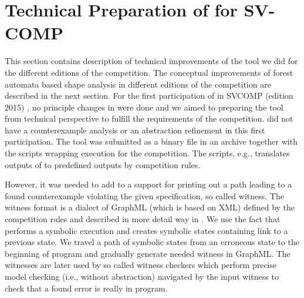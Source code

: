 {%


\section{Technical Preparation of \forester for SV-COMP}
This section contains description of technical improvements of the tool we did
for the different editions of the  competition.
The conceptual improvements of forest automata based shape analysis in different
editions of the competition are described in the next section.
For the first participation of \forester in SVCOMP (edition 2015) \cite{svcomp15-forester},
no principle changes in \forester were done and we aimed to preparing the tool from technical
perspective to fulfill the requirements of the competition.
\forester did not have a counterexample analysis or an abstraction refinement in this first participation.
The tool was submitted as a binary file in an archive together
with the scripts wrapping execution for the competition.
The scripts, e.g., translates outputs of \forester to predefined outputs by competition rules.

However, it was needed to add to \forester a support for printing out a path leading to
a found counterexample violating the given specification,
so called witness.
The witness format is a dialect of GraphML (which is based on XML) defined by the competition rules and described in more detail way in \cite{fse15-witness}.
We use the fact that \forester performs a symbolic execution and creates symbolic states containing link to a previous state.
We travel a path of symbolic states from an erroneous state to the beginning of program and gradually generate needed witness in GraphML.
The witnesses are later used by so called witness checkers which perform precise model checking (i.e., without abstraction)
navigated by the input witness to check that a found error is really in program.

}
